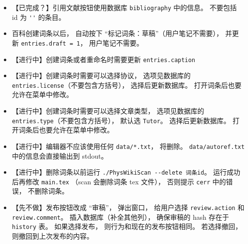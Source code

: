 \begin{itemize}
\item 【已完成？】引用文献按钮使用数据库 \verb|bibliography| 中的信息。 不要包括 id 为 \verb|''| 的条目。
\item 百科创建词条以后， 自动按下 “标记词条：草稿”（用户笔记不需要）， 并更新 \verb|entries.draft = 1|， 用户笔记不需要。
\item 【进行中】创建词条或者重命名时需要更新 \verb|entries.caption|
\item 【进行中】创建词条时需要可以选择协议， 选项见数据库的 \verb|entries.license|（不要包含方括号）， 选择后更新数据库。 打开词条后也要允许在菜单中修改。
\item 【进行中】创建词条时需要可以选择文章类型， 选项见数据库的 \verb|entries.type|（不要包含方括号）， 默认选 \verb|Tutor|。 选择后更新数据库。 打开词条后也要允许在菜单中修改。
\item 【进行中】编辑器不应该使用任何 \verb|data/*.txt|， 将删除。 \verb|data/autoref.txt| 中的信息会直接输出到 stdout。


\item 【进行中】删除词条以前运行 \verb|./PhysWikiScan --delete 词条id|。 运行成功后再修改 \verb|main.tex| （scan 会删除词条 tex 文件）， 否则提示 \verb`cerr` 中的错误， 不删除词条。
\item 【先不做】发布按钮改成 “审稿”， 弹出窗口， 给用户选择 \verb|review.action| 和 \verb|review.comment|。 插入数据库（补全其他列）， 确保审稿的 hash 存在于 \verb|history| 表。 如果选择发布， 则行为和现在的发布按钮相同。 若选择撤回， 则撤回到上次发布的内容。
\end{itemize}

